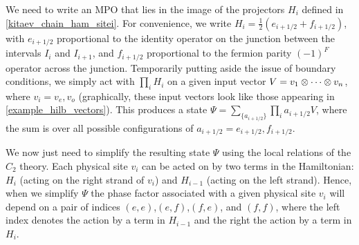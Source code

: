 We need to write an MPO that lies in the image of the projectors $H_i$ defined in \eqref{kitaev_chain_ham_sitei}. 
For convenience, we write $H_i =\frac{1}{2}( e_{i+1/2} + f_{i+1/2})$, with $e_{i+1/2}$ proportional to the identity operator on the junction between the intervals $I_i$ and $I_{i+1}$, and $f_{i+1/2}$ proportional to the fermion parity $(-1)^F$ operator across the junction.
Temporarily putting aside the issue of boundary conditions, we simply act with $\prod_i H_i$ on 
a given input vector $V = v_1\otimes \cdots \otimes v_n$, where $v_i=v_e,v_o$ (graphically, these input vectors look like those appearing in \eqref{example_hilb_vectors}).
This produces a state $\Psi = \sum_{\{ a_{i+1/2} \} } \prod_i a_{i+1/2} V$, 
where the sum is over all possible configurations of $a_{i+1/2} = e_{i+1/2}, f_{i+1/2}$.  

We now just need to simplify the resulting state $\Psi$ using the local relations of the $C_2$ theory. 
Each physical site $v_i$ can be acted on by two terms in the Hamiltonian: $H_i$ (acting on the right strand of $v_i$) and $H_{i-1}$ (acting on the left strand). 
Hence, when we simplify $\Psi$ the phase factor associated with a given physical site $v_i$ will depend on a pair of indices $(e,e)$,$(e,f)$,$(f,e)$, and $(f,f)$, where the left index denotes the action by a term in $H_{i-1}$ and the right the action by a term in $H_{i}$. 

